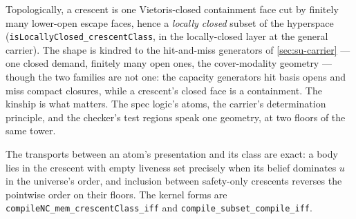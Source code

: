 Topologically, a crescent is one Vietoris-closed containment face
cut by finitely many lower-open escape faces, hence a
\emph{locally closed} subset of the hyperspace
(\texttt{isLocallyClosed\_crescentClass}, in the locally-closed
layer at the general carrier). The shape is kindred to the
hit-and-miss generators of \autoref{sec:su-carrier} --- one closed
demand, finitely many open ones, the cover-modality geometry ---
though the two families are not one: the capacity generators hit
basis opens and miss compact closures, while a crescent's closed
face is a containment. The kinship is what matters. The spec
logic's atoms, the carrier's determination principle, and the
checker's test regions speak one geometry, at two floors of the
same tower.

The transports between an atom's presentation and its class are
exact: a body lies in the crescent with empty liveness set
precisely when its belief dominates $u$ in the universe's order,
and inclusion between safety-only crescents reverses the pointwise
order on their floors. The kernel forms are
\texttt{compileNC\_mem\_crescentClass\_iff} and
\texttt{compile\_subset\_compile\_iff}.


